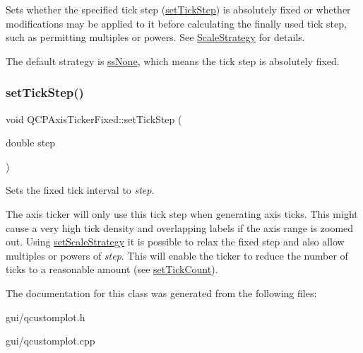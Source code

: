 Sets whether the specified tick step (\hyperlink{classQCPAxisTickerFixed_a4bc83d85a4f81d4abdd3fa5042d7b833}{set\+Tick\+Step}) is absolutely fixed or whether modifications may be applied to it before calculating the finally used tick step, such as permitting multiples or powers. See \hyperlink{classQCPAxisTickerFixed_a15b3d38b935d404b1311eb85cfb6a439}{Scale\+Strategy} for details.

The default strategy is \hyperlink{classQCPAxisTickerFixed_a15b3d38b935d404b1311eb85cfb6a439a6621275677a05caa0de204ae3956b85f}{ss\+None}, which means the tick step is absolutely fixed. \mbox{\label{classQCPAxisTickerFixed_a4bc83d85a4f81d4abdd3fa5042d7b833}} 
\subsubsection{\texorpdfstring{set\+Tick\+Step()}{setTickStep()}}
{\footnotesize\ttfamily void Q\+C\+P\+Axis\+Ticker\+Fixed\+::set\+Tick\+Step (\begin{DoxyParamCaption}\item[{double}]{step }\end{DoxyParamCaption})}

Sets the fixed tick interval to {\itshape step}.

The axis ticker will only use this tick step when generating axis ticks. This might cause a very high tick density and overlapping labels if the axis range is zoomed out. Using \hyperlink{classQCPAxisTickerFixed_acbc7c9bcd80b3dc3edee5f0519d301f6}{set\+Scale\+Strategy} it is possible to relax the fixed step and also allow multiples or powers of {\itshape step}. This will enable the ticker to reduce the number of ticks to a reasonable amount (see \hyperlink{classQCPAxisTicker_a47752abba8293e6dc18491501ae34008}{set\+Tick\+Count}). 

The documentation for this class was generated from the following files\+:\begin{DoxyCompactItemize}
\item 
gui/qcustomplot.\+h\item 
gui/qcustomplot.\+cpp\end{DoxyCompactItemize}
